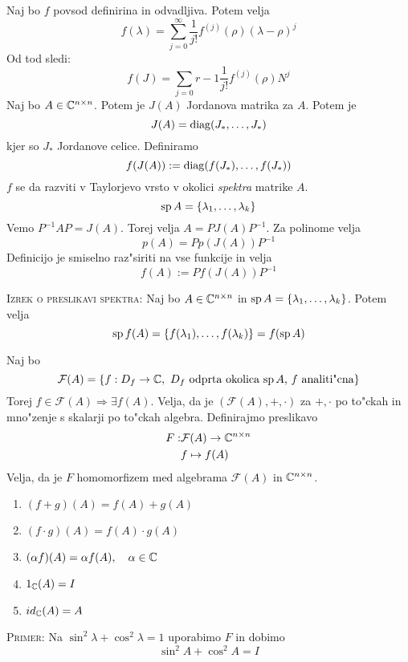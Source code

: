 Naj bo $f$ povsod definirina in odvadljiva. Potem velja
\begin{equation*}
f(\lambda) = \sum_{j = 0}^\infty \dfrac{1}{j!} f^{(j)} (\rho) (\lambda - \rho)^j
\end{equation*}
Od tod sledi:
\begin{equation*}
f(J) = \sum_{j = 0}{r-1} \dfrac{1}{j!} f^{(j)} (\rho) N^j
\end{equation*}
Naj bo $A \in \mathbb{C}^{n \times n}$. Potem je $J(A)$ Jordanova matrika za $A$. Potem je 
\begin{equation*}
J(A) = \operatorname{diag}(J_*, \ldots, J_*)
\end{equation*}
kjer so $J_*$ Jordanove celice. Definiramo
\begin{equation*}
f(J(A)) := \operatorname{diag}(f(J_*), \ldots, f(J_*))
\end{equation*}
$f$ se da razviti v Taylorjevo vrsto v okolici \emph{spektra} matrike $A$.
\begin{equation*}
\operatorname{sp} A = \{\lambda_1, \ldots, \lambda_k\}
\end{equation*}
Vemo $P^{-1}AP = J(A)$. Torej velja $A = PJ(A)P^{-1}$. Za polinome velja
\begin{equation*}
p(A) = P p(J(A)) P^{-1}
\end{equation*}
Definicijo je smiselno raz"siriti na vse funkcije in velja
\begin{equation*}
f(A) := Pf(J(A)) P^{-1}
\end{equation*}

\textsc{Izrek o preslikavi spektra:} Naj bo $A \in \mathbb{C}^{n \times n}$ in $\operatorname{sp} A = \{ \lambda_1, \ldots, \lambda_k \}$. Potem velja
\begin{equation*}
\operatorname{sp} f(A) = \{ f(\lambda_1), \ldots, f(\lambda_k) \} = f(\operatorname{sp} A)
\end{equation*}

Naj bo
\begin{equation*}
\mathcal{F}(A) = \{ f: D_f \to \mathbb{C}, \text{ $D_f$ odprta okolica $\operatorname{sp} A$, $f$ analiti"cna} \}
\end{equation*}
Torej $f \in \mathcal{F}(A) \Rightarrow \exists f(A)$. Velja, da  je $(\mathcal{F}(A), +, \cdot)$ za $+, \cdot$ po to"ckah in mno"zenje s skalarji po to"ckah algebra. Definirajmo preslikavo
\begin{align*}
F: & \mathcal{F}(A) \to \mathbb{C}^{n \times n} \\
& f \mapsto f(A)
\end{align*}
Velja, da je $F$ homomorfizem med algebrama $\mathcal{F}(A)$ in $\mathbb{C}^{n \times n}$.
\begin{enumerate}
    \item $(f + g)(A) = f(A) + g(A)$
    \item $(f \cdot g)(A) = f(A) \cdot g(A)$
    \item $(\alpha f)(A) = \alpha f(A), \quad \alpha \in \mathbb{C}$
    \item $1_{\mathbb{C}} (A) = I$
    \item $id_{\mathbb{C}}(A) = A$
\end{enumerate}
\textsc{Primer:} Na $\sin^2 \lambda + \cos^2 \lambda = 1$ uporabimo $F$ in dobimo
\begin{equation*}
\sin^2 A + \cos^2 A = I
\end{equation*}

